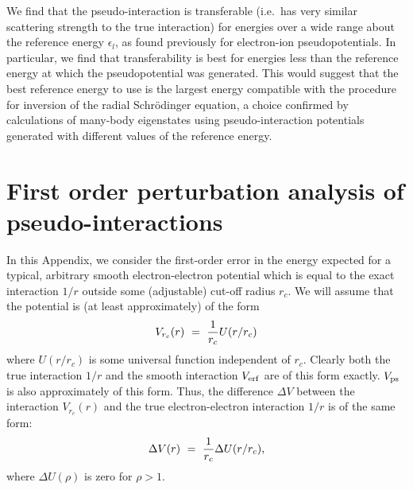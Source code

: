 We find that the pseudo-interaction is transferable (i.e.\ has very 
similar scattering strength to the true interaction) for energies over 
a wide range about the reference energy $\epsilon_l$, as found 
previously for electron-ion pseudopotentials.
In particular, we find that transferability is best for energies less
than the reference energy at which the pseudopotential was generated.
This would suggest that the best reference energy to use is the largest
energy compatible with the procedure for inversion of the radial 
Schr\"odinger equation, a choice confirmed by calculations of many-body
eigenstates using pseudo-interaction potentials generated with different 
values of the reference energy.



%
%
\section{First order perturbation analysis of pseudo-interactions}
\label{app:acc_psint}
%
%

In this Appendix, we consider the first-order error in the energy expected for 
a typical, arbitrary smooth electron-electron potential which is equal 
to the exact interaction $1/r$ outside some (adjustable) cut-off radius $r_c$.
We will assume that the potential is (at least approximately) of the form 
\begin{eqnarray}
 V_{r_c}(r) ~=~ {1\over r_c} U(r/r_c) 
\label{eq:psform}
\end{eqnarray}
where $U(r/r_c)$ is some universal function independent of $r_c$.
Clearly both the true interaction $1/r$ and the smooth interaction $V_{\rm erf}$
are of this form exactly.
$V_{\rm ps}$ is also approximately of this form.
Thus, the difference $\Delta V$ between the interaction $V_{r_c}(r)$ and the
true electron-electron interaction $1/r$ is of the same form:
\begin{eqnarray}
 \Delta V(r) ~=~ {1\over r_c} \Delta U(r/r_c) ,
\label{eq:psdiff}
\end{eqnarray}
where $\Delta U(\rho)$ is zero for $\rho>1$.

